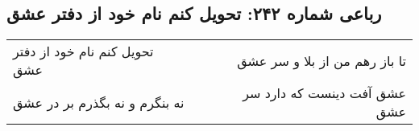 \begin{center}
\section*{رباعی شماره ۲۴۲: تحویل کنم نام خود از دفتر عشق}
\label{sec:sh242}
\begin{longtable}{l p{0.5cm} r}
تحویل کنم نام خود از دفتر عشق
&&
تا باز رهم من از بلا و سر عشق
\\
نه بنگرم و نه بگذرم بر در عشق
&&
عشق آفت دینست که دارد سر عشق
\\
\end{longtable}
\end{center}
